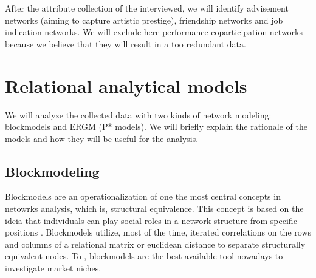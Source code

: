 \documentclass[a4paper, 12pt, openright, oneside, german, french, brazil, english, article]{abntex2}
\begin{document}
	After the attribute collection of the interviewed, we will identify advisement networks (aiming to capture artistic prestige), friendship networks and job indication networks. We will exclude here performance coparticipation networks because we believe that they will result in a too redundant data.
	



	\section{Relational analytical models}
		
	
	We will analyze the collected data with two kinds of network modeling: blockmodels and ERGM (P* models). We will briefly explain the rationale of the models and how they will be useful for the analysis.
	
	\subsection{Blockmodeling}
	
	
	Blockmodels are an operationalization of one the most central concepts in netowrks analysis, which is, structural equivalence. This concept is based on the ideia that individuals can play social roles in a network structure from specific positions \cite{lazega2014redes}. Blockmodels utilize, most of the time, iterated correlations on the rows and columns of a relational matrix or euclidean distance to separate structurally equivalent nodes. To , blockmodels are the best available tool nowadays to investigate market niches.
	
\end{document}
